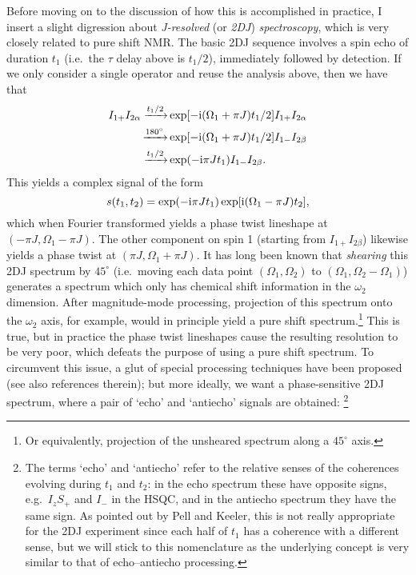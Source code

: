 Before moving on to the discussion of how this is accomplished in practice, I insert a slight digression about \textit{J-resolved} (or \textit{2DJ}) \textit{spectroscopy}, which is very closely related to pure shift NMR.
The basic 2DJ sequence involves a spin echo of duration $t_1$ (i.e.\ the $\tau$ delay above is $t_1/2$), immediately followed by detection.
If we only consider a single operator and reuse the analysis above, then we have that
\begin{align}
    \label{eq:2dj_operator_analysis}
    I_{1+}I_{2\alpha} \xrightarrow[]{t_1/2} &\exp[-\mathrm{i}(\Omega_1 + \pi J)t_1/2] I_{1+}I_{2\alpha} \notag \\
    \xrightarrow[]{180^\circ} &\exp[-\mathrm{i}(\Omega_1 + \pi J)t_1/2] I_{1-}I_{2\beta} \notag \\
                      \xrightarrow[]{t_1/2} &\exp(-\mathrm{i} \pi J t_1) I_{1-}I_{2\beta}.
\end{align}
This yields a complex signal of the form
\begin{equation}
    \label{eq:2dj_signal}
    s(t_1, t_2) = \exp(-\mathrm{i}\pi J t_1) \exp[\mathrm{i}(\Omega_1 - \pi J) t_2],
\end{equation}
which when Fourier transformed yields a phase twist lineshape at $(-\pi J, \Omega_1 - \pi J)$.
The other component on spin 1 (starting from $I_{1+}I_{2\beta}$) likewise yields a phase twist at $(\pi J, \Omega_1 + \pi J)$.
It has long been known that \textit{shearing} this 2DJ spectrum by $45^\circ$ (i.e.\ moving each data point $(\Omega_1, \Omega_2)$ to $(\Omega_1, \Omega_2 - \Omega_1)$) generates a spectrum which only has chemical shift information in the $\omega_2$ dimension.
After magnitude-mode processing, projection of this spectrum onto the $\omega_2$ axis, for example, would in principle yield a pure shift spectrum.\footnote{Or equivalently, projection of the unsheared spectrum along a $45^\circ$ axis\autocite{Aue1976JCP}.}
This is true, but in practice the phase twist lineshapes cause the resulting resolution to be very poor, which defeats the purpose of using a pure shift spectrum.
To circumvent this issue, a glut of special processing techniques have been proposed\autocite{Xu1991JMR,Nuzillard1996JMRSA,Simova1997JMR} (see also references therein); but more ideally, we want a phase-sensitive 2DJ spectrum, where a pair of `echo' and `antiecho' signals are obtained:%
\footnote{The terms `echo' and `antiecho' refer to the relative senses of the coherences evolving during $t_1$ and $t_2$: in the echo spectrum these have opposite signs, e.g.\ $I_zS_+$ and $I_-$ in the HSQC, and in the antiecho spectrum they have the same sign. As pointed out by Pell and Keeler\autocite{Pell2007JMR}, this is not really appropriate for the 2DJ experiment since each half of $t_1$ has a coherence with a different sense, but we will stick to this nomenclature as the underlying concept is very similar to that of echo--antiecho processing.}
